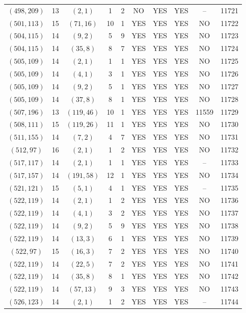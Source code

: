\begin{longtable}{|c|c|c|c|c|c|c|c|c|c|}
$(498, 209)$ & 13 & $(2, 1)$ & 1 & 2 & NO & YES & YES & -- & 11721\\
$(501, 113)$ & 15 & $(71, 16)$ & 10 & 1 & YES & YES & YES & NO & 11722\\
$(504, 115)$ & 14 & $(9, 2)$ & 5 & 9 & YES & YES & YES & NO & 11723\\
$(504, 115)$ & 14 & $(35, 8)$ & 8 & 7 & YES & YES & YES & NO & 11724\\
$(505, 109)$ & 14 & $(2, 1)$ & 1 & 1 & YES & YES & YES & NO & 11725\\
$(505, 109)$ & 14 & $(4, 1)$ & 3 & 1 & YES & YES & YES & NO & 11726\\
$(505, 109)$ & 14 & $(9, 2)$ & 5 & 1 & YES & YES & YES & NO & 11727\\
$(505, 109)$ & 14 & $(37, 8)$ & 8 & 1 & YES & YES & YES & NO & 11728\\
$(507, 196)$ & 13 & $(119, 46)$ & 10 & 1 & YES & YES & YES & 11559 & 11729\\
$(508, 111)$ & 15 & $(119, 26)$ & 11 & 1 & YES & YES & YES & NO & 11730\\
$(511, 155)$ & 14 & $(7, 2)$ & 4 & 7 & YES & YES & YES & NO & 11731\\
$(512, 97)$ & 16 & $(2, 1)$ & 1 & 2 & YES & YES & YES & NO & 11732\\
$(517, 117)$ & 14 & $(2, 1)$ & 1 & 1 & YES & YES & YES & -- & 11733\\
$(517, 157)$ & 14 & $(191, 58)$ & 12 & 1 & YES & YES & YES & NO & 11734\\
$(521, 121)$ & 15 & $(5, 1)$ & 4 & 1 & YES & YES & YES & -- & 11735\\
$(522, 119)$ & 14 & $(2, 1)$ & 1 & 2 & YES & YES & YES & NO & 11736\\
$(522, 119)$ & 14 & $(4, 1)$ & 3 & 2 & YES & YES & YES & NO & 11737\\
$(522, 119)$ & 14 & $(9, 2)$ & 5 & 9 & YES & YES & YES & NO & 11738\\
$(522, 119)$ & 14 & $(13, 3)$ & 6 & 1 & YES & YES & YES & NO & 11739\\
$(522, 97)$ & 15 & $(16, 3)$ & 7 & 2 & YES & YES & YES & NO & 11740\\
$(522, 119)$ & 14 & $(22, 5)$ & 7 & 2 & YES & YES & YES & NO & 11741\\
$(522, 119)$ & 14 & $(35, 8)$ & 8 & 1 & YES & YES & YES & NO & 11742\\
$(522, 119)$ & 14 & $(57, 13)$ & 9 & 3 & YES & YES & YES & NO & 11743\\
$(526, 123)$ & 14 & $(2, 1)$ & 1 & 2 & YES & YES & YES & -- & 11744\\

\end{longtable}
